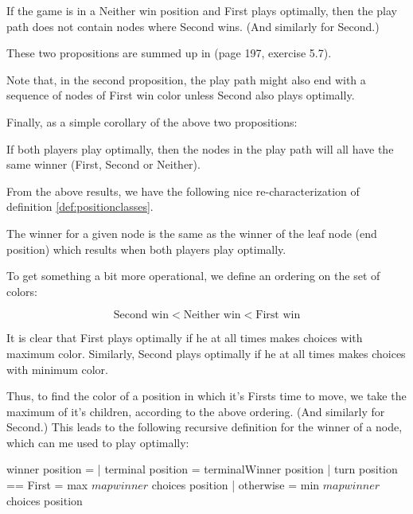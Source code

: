 \begin{proposition}
If the game is in a Neither win position and First plays optimally, then the play path does not contain nodes where Second wins.
(And similarly for Second.)
\end{proposition}

These two propositions are summed up in \citep{aimodernapproach} (page 197, exercise 5.7).

Note that, in the second proposition, the play path might also end with a sequence of nodes of First win color unless Second also plays optimally.

Finally, as a simple corollary of the above two propositions:

\begin{proposition}
If both players play optimally, then the nodes in the play path will all have the same winner (First, Second or Neither).
\end{proposition}

From the above results, we have the following nice re-characterization of definition \ref{def:positionclasses}.

\begin{theorem}
The winner for a given node is the same as the winner of the leaf node (end position) which results when both players play optimally.
\end{theorem}


To get something a bit more operational, we define an ordering on the set of colors:

\begin{equation}
\label{eq:winnerordering}
  \text{Second win} < \text{Neither win} < \text{First win}
\end{equation}

It is clear that First plays optimally if he at all times makes choices with maximum color.
Similarly, Second plays optimally if he at all times makes choices with minimum color.

Thus, to find the color of a position in which it's Firsts time to move, we take the maximum of it's children, according to the above ordering. (And similarly for Second.)
This leads to the following recursive definition for the winner of a node, which can me used to play optimally:

\begin{code}
  winner position =
    | terminal position       = terminalWinner position
    | turn position == First  = max $ map winner $ choices position
    | otherwise               = min $ map winner $ choices position
\end{code}


